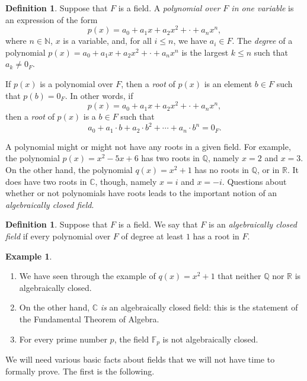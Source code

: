 \documentclass[a4paper]{memoir}
\theoremstyle{definition}
\newtheorem{definition}[theorem]{Definition}
\newtheorem{example}[theorem]{Example}
\newcommand{\bb}{\mathbb}
\begin{document}
\begin{definition}
  Suppose that $F$ is a field. A \emph{polynomial over $F$ in one variable} is an expression of 
  the form 
  \[
    p(x) = a_0 + a_1 x + a_2 x^2 + \cdot + a_n x^n,
  \]
  where $n \in \bb{N}$, $x$ is a variable, and, for all $i \leq n$, we have $a_i \in F$.
  The \emph{degree} of a polynomial $p(x) = a_0 + a_1 x + a_2 x^2 + \cdot + a_n x^n$ is 
  the largest $k \leq n$ such that $a_k \neq 0_F$.
  
  If $p(x)$ is a polynomial over $F$, then a \emph{root} of $p(x)$ is an element $b \in F$ 
  such that $p(b) = 0_F$. In other words, if 
  \[
    p(x) = a_0 + a_1 x + a_2 x^2 + \cdot + a_n x^n,
  \]
  then a \emph{root} of $p(x)$ is a $b \in F$ such that
  \[
    a_0 + a_1 \cdot b + a_2 \cdot b^2 + \cdots + a_n \cdot b^n = 0_F.
  \]
\end{definition}

A polynomial might or might not have any roots in a given field. For example, 
the polynomial $p(x) = x^2 - 5x + 6$ has two roots in $\bb{Q}$, namely $x = 2$ and $x = 3$. 
On the other hand, the polynomial $q(x) = x^2 + 1$ has no roots in $\bb{Q}$, or in $\bb{R}$. 
It does have two roots in $\bb{C}$, though, namely $x = i$ and $x = -i$. Questions about 
whether or not polynomials have roots leads to the important notion of an 
\emph{algebraically closed field}.

\begin{definition}
  Suppose that $F$ is a field. We say that $F$ is an \emph{algebraically closed field} if 
  every polynomial over $F$ of degree at least $1$ has a root in $F$.
\end{definition}

\begin{example}
  \begin{enumerate}
    \item We have seen through the example of $q(x) = x^2 + 1$ that neither $\bb{Q}$ nor 
    $\bb{R}$ is algebraically closed.
    \item On the other hand, $\bb{C}$ \emph{is} an algebraically closed field: this is the 
    statement of the Fundamental Theorem of Algebra.
    \item For every prime number $p$, the field $\bb{F}_p$ is not algebraically closed.
  \end{enumerate}
\end{example}

We will need various basic facts about fields that we will not have time to formally prove. 
The first is the following.
\end{document}
